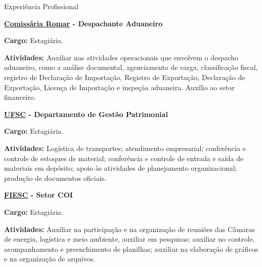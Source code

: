 \begin{rubric}{Experiência Profissional}{
  \entry*[2014]
  \textbf{\href{http://www.comissariaromar.com.br/}{Comissária Romar}
    - Despachante Aduaneiro}

  \textbf{Cargo:} Estagiária.

  \textbf{Atividades:} Auxiliar nas atividades operacionais que
  envolvem o despacho aduaneiro, como a análise documental,
  agenciamento de carga, classificação fiscal, registro de
  Declaração de Importação, Registro de Exportação, Declaração de
  Exportação, Licença de Importação e inspeção aduaneira. Auxílio ao
  setor financeiro.

  \entry*[2013 - 2014]
  \textbf{\href{http://www.ufsc.br/}{UFSC} - Departamento de Gestão
    Patrimonial}

  \textbf{Cargo:} Estagiária.

  \textbf{Atividades:} Logística de transportes; atendimento
  empresarial; conferência e controle de estoques de material;
  conferência e controle de entrada e saída de materiais em depósito;
  apoio às atividades de planejamento organizacional; produção de
  documentos oficiais.

  \entry*[2012 - 2013]
  \textbf{\href{http://www.fiesc.com.br/}{FIESC} - Setor COI}

  \textbf{Cargo:} Estagiária.

  \textbf{Atividades:} Auxiliar na participação e na organização de
  reuniões das Câmaras de energia, logística e meio ambiente, auxiliar
  em pesquisas; auxiliar no controle, acompanhamento e preenchimento
  de planilhas; auxiliar na elaboração de gráficos e na organização de
  arquivos.

}\end{rubric}

